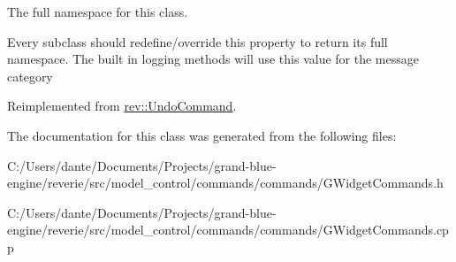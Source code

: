 The full namespace for this class. 

Every subclass should redefine/override this property to return its full namespace. The built in logging methods will use this value for the message category 

Reimplemented from \mbox{\hyperlink{classrev_1_1_undo_command_aea7ceb3f5ea266e697f01a65da7afec5}{rev\+::\+Undo\+Command}}.



The documentation for this class was generated from the following files\+:\begin{DoxyCompactItemize}
\item 
C\+:/\+Users/dante/\+Documents/\+Projects/grand-\/blue-\/engine/reverie/src/model\+\_\+control/commands/commands/G\+Widget\+Commands.\+h\item 
C\+:/\+Users/dante/\+Documents/\+Projects/grand-\/blue-\/engine/reverie/src/model\+\_\+control/commands/commands/G\+Widget\+Commands.\+cpp\end{DoxyCompactItemize}
